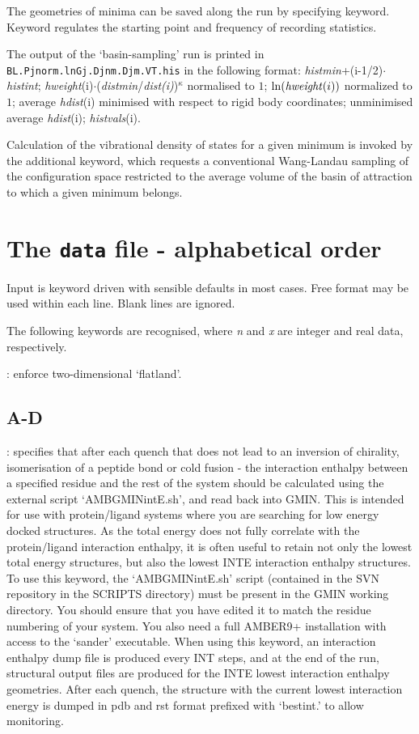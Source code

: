 The geometries of minima can be saved along the run by specifying { } keyword. Keyword {}
regulates the starting point and frequency of recording statistics.

The output of the `basin-sampling' run is printed in {\tt BL.Pjnorm.lnGj.Djnm.Djm.VT.his} in the
following format: 
{\it histmin}+(i-1/2)$\cdot${\it histint}; {\it hweight}(i)$\cdot$({\it distmin}/{\it dist(i)})$^\kappa$ 
normalised to $1$; ${\it \ln(hweight}(i))$ normalized to $1$;
average {\it hdist}(i) minimised with respect to rigid body coordinates; unminimised average 
{\it hdist}(i); {\it histvals}(i). 

Calculation of the
vibrational density of states for a given minimum is invoked by 
the additional {} keyword, which
requests a conventional Wang-Landau sampling of the configuration 
space restricted to the average volume of the basin of
attraction to which a given minimum belongs.\cite{BogdanWC06}

\section{The {\tt data} file - alphabetical order}

Input is keyword driven with sensible defaults in most cases. 
Free format may be used within each line. Blank lines are ignored.

The following keywords are recognised, where {\it n\/} and {\it x\/} are integer and
real data, respectively.

\smallskip
{}: enforce two-dimensional `flatland'.


\subsection{A-D}

: specifies that after each quench that does not lead to an inversion of chirality, 
isomerisation of a peptide bond or cold fusion - the interaction enthalpy between a specified residue and the rest of the system
should be calculated using the external script `AMBGMINintE.sh', and read back into GMIN. This is intended for
use with protein/ligand systems where you are searching for low energy docked structures. As the total energy
does not fully correlate with the protein/ligand interaction enthalpy, it is often useful to retain not only the
lowest {\/} total energy structures, but also the lowest {INTE\/} interaction enthalpy structures.
To use this keyword, the `AMBGMINintE.sh' script (contained in the SVN repository in the SCRIPTS directory) must
be present in the GMIN working directory. You should ensure that you have edited it to match the residue numbering
of your system. You also need a full AMBER9+ installation with access to the `sander' executable. When using this
keyword, an interaction enthalpy dump file is produced every {INT\/} steps, and at the end of the run, 
structural output files are produced for the {INTE\/} lowest interaction enthalpy geometries. After each quench, 
the structure with the current lowest interaction energy is dumped in pdb and rst format prefixed with `bestint.' to allow
monitoring.

